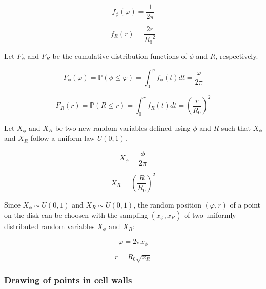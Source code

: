 \begin{appendix}
\begin{equation}
  f_\phi(\varphi) =
    \frac{1}{2 \pi}
\end{equation}

\begin{equation}
  f_R(r) =
    \frac{2r}{{R_0}^2}
\end{equation}

\medskip

Let \( F_\phi \) and  \( F_R \) be the  cumulative distribution functions of \( \phi \) and \( R \), respectively.

\begin{equation}
  F_\phi(\varphi) =
    \mathbb{P}(\phi \leq \varphi) =
      \int_0^\varphi f_\phi(t) dt = \frac{\varphi }{2 \pi}
\end{equation}

\begin{equation}
  F_R(r) =
    \mathbb{P}(R \leq r) =
      \int_0^r f_R(t) dt = \left( \frac{r}{R_0} \right)^2
\end{equation}

\medskip

Let \( X_\phi \) and \( X_R \) be two new random variables defined using \( \phi \) and \( R \) such that \( X_\phi \) and \( X_R \) follow a uniform law \( U(0, 1) \).

\begin{equation}
  X_\phi =
    \frac{\phi}{2 \pi}
\end{equation}

\begin{equation}
  X_R =
    \left( \frac{R}{R_0} \right)^2
\end{equation}

\medskip

Since \( X_\phi \sim U(0, 1) \) and \( X_R \sim U(0, 1) \), the random position \( (\varphi, r)\) of a point on the disk can be choosen with the sampling \( ( x_\phi, x_R ) \) of two uniformly distributed random variables \( X_\phi \) and \( X_R \):

\begin{equation}\label{eq:circle-random-position-theta}
  \varphi =
    2 \pi x_\phi
\end{equation}

\begin{equation}\label{eq:circle-random-position-r}
  r =
    R_0 \sqrt{x_R}
\end{equation}

\subsubsection{Drawing of points in cell walls}\label{sec:cell-random-position}


\end{appendix}
